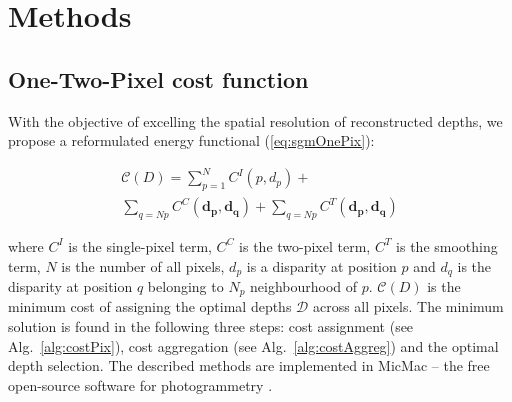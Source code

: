\documentclass[journal]{IEEEtran}
\begin{document}
 
%

\section{Methods}
%
\subsection{One-Two-Pixel cost function}
With the objective of excelling the spatial resolution of reconstructed depths, we propose a reformulated energy functional (\ref{eq:sgmOnePix}):\par 
%


\begin{figure}[h]
\begin{equation}\label{eq:sgmOnePix}       
\begin{split}          
  \mathcal C (D) = \sum_{p=1}^N  C^I(p,d_p) +  \\
                   \sum_{q=Np} C^C(\mathbf{d_p},\mathbf{d_q}) + \sum_{q=Np} C^T(\mathbf{d_p},\mathbf{d_q}) 
\end{split}                  
\end{equation}
\end{figure}
% 
where $C^I$ is the single-pixel term, $C^C$ is the two-pixel term, $C^T$ is the smoothing term, $N$ is the number of all pixels, $d_p$ is a disparity at position $p$ and $d_q$ is the disparity at position $q$ belonging to $N_p$ neighbourhood of $p$. $\mathcal C (D)$ is the minimum cost of assigning the optimal depths  $ \mathcal D$ across all pixels.  The minimum solution is found in the following three steps: cost assignment (see Alg.~\ref{alg:costPix}), cost aggregation (see Alg.~\ref{alg:costAggreg}) and the optimal depth selection. The described methods are implemented in MicMac -- the free open-source software for photogrammetry \cite{rupnik2017micmac}.\par 
%
\end{document}

